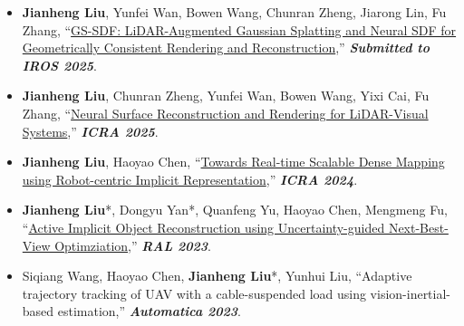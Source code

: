 %
%



\begin{itemize}
	\item \textbf{Jianheng Liu}, Yunfei Wan, Bowen Wang, Chunran Zheng, Jiarong Lin, Fu Zhang, ``\href{https://jianhengliu.github.io/Projects/GS-SDF/}{GS-SDF: LiDAR-Augmented Gaussian Splatting and Neural SDF for Geometrically Consistent Rendering and Reconstruction},''
	\textbf{\emph{Submitted to IROS 2025}}.\\
	\vspace{-8pt}
	\item \textbf{Jianheng Liu}, Chunran Zheng, Yunfei Wan, Bowen Wang, Yixi Cai, Fu Zhang, ``\href{https://jianhengliu.github.io/Projects/M2Mapping/}{Neural Surface Reconstruction and Rendering for LiDAR-Visual Systems},''
	\textbf{\emph{ICRA 2025}}.\\
	\vspace{-8pt}
	\item \textbf{Jianheng Liu}, Haoyao Chen, ``\href{https://github.com/HITSZ-NRSL/RIM}{Towards Real-time Scalable Dense Mapping using Robot-centric Implicit Representation},''
	\textbf{\emph{ICRA 2024}}.\\
	\vspace{-8pt}
	\item \textbf{Jianheng Liu}*, Dongyu Yan*, Quanfeng Yu, Haoyao Chen, Mengmeng Fu, ``\href{https://arxiv.org/abs/2303.16739}{Active Implicit Object Reconstruction using Uncertainty-guided Next-Best-View Optimziation},''
	\textbf{\emph{RAL 2023}}.\\
	\vspace{-8pt}
	\item Siqiang Wang, Haoyao Chen, \textbf{Jianheng Liu}*, Yunhui Liu, ``Adaptive trajectory tracking of UAV with a cable-suspended load using vision-inertial-based estimation,''
	\textbf{\emph{Automatica 2023}}.\\
	\vspace{-8pt}

\end{itemize}
